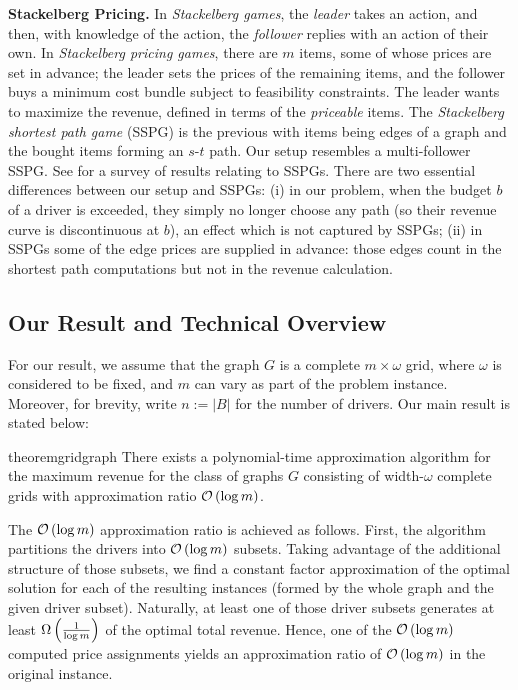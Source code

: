 \noindent \textbf{Stackelberg Pricing.} In \emph{Stackelberg games}, the \emph{leader} takes an action, and then, with knowledge of the action, the \emph{follower} replies with an action of their own. In \emph{Stackelberg pricing games}, there are $m$ items, some of whose prices are set in advance; the leader sets the prices of the remaining items, and the follower buys a minimum cost bundle subject to feasibility constraints. The leader wants to maximize the revenue, defined in terms of the \emph{priceable} items.
The \emph{Stackelberg shortest path game} (SSPG) is the previous with items being edges of a graph and the bought items forming an $s$-$t$ path. Our setup resembles a multi-follower SSPG. See \cite{stackelberg_packing,stackelberg_network_pricing,hardness_stackelberg_shortest_path,widmayer} for a survey of results relating to SSPGs. There are two essential differences between our setup and SSPGs: (i) in our problem, when the budget $b$ of a driver is exceeded, they simply no longer choose any path (so their revenue curve is discontinuous at $b$), an effect which is not captured by SSPGs;  (ii) in SSPGs some of the edge prices are supplied in advance: those edges count in the shortest path computations but not in the revenue calculation.

\subsection{Our Result and Technical Overview}

For our result, we assume that the graph $G$ is a complete $m \times \omega$ grid, where $\omega$ is considered to be fixed, and $m$ can vary as part of the problem instance. Moreover, for brevity, write $n := |B|$ for the number of drivers. Our main result is stated below:

\begin{restatable}{theorem}{gridgraph}\label{thm:gridgraph} There exists a polynomial-time approximation algorithm for the maximum revenue for the class of graphs $G$ consisting of width-$\omega$ complete grids with approximation ratio $\mathcal{O} \left( \log m \right)$. 
\end{restatable}

The $\mathcal{O} \left( \log m \right)$ approximation ratio is achieved as follows.
First, the algorithm partitions the drivers into $\mathcal{O} \left( \log m \right)$ subsets.
Taking advantage of the additional structure of those subsets, we find a constant factor approximation of the optimal solution for each of the resulting instances (formed by the whole graph and the given driver subset).
Naturally, at least one of those driver subsets generates at least $\Omega \left( \frac{1}{\log m} \right)$ of the optimal total revenue.
%
Hence, one of the $\mathcal{O} \left( \log m \right)$ computed price assignments yields an approximation ratio of $\mathcal{O} \left( \log m \right)$ in the original instance.

